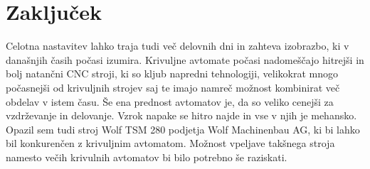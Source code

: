\newpage
\section{Zaključek}
Celotna nastavitev lahko traja tudi več delovnih dni in zahteva
izobrazbo, ki v današnjih časih počasi izumira. Krivuljne avtomate
počasi nadomeščajo hitrejši in bolj natančni CNC stroji, ki so kljub
napredni tehnologiji, velikokrat mnogo počasnejši od krivuljnih strojev saj te
imajo namreč možnost kombinirat več obdelav v istem času. Še ena prednost avtomatov je, da so veliko cenejši
za vzdrževanje in delovanje. Vzrok napake se hitro najde in vse v njih je
mehansko. Opazil sem tudi stroj Wolf TSM 280 podjetja Wolf Machinenbau AG,
ki bi lahko bil konkurenčen z krivuljnim avtomatom. Možnost vpeljave
takšnega stroja namesto večih krivulnih avtomatov bi bilo potrebno
še raziskati.